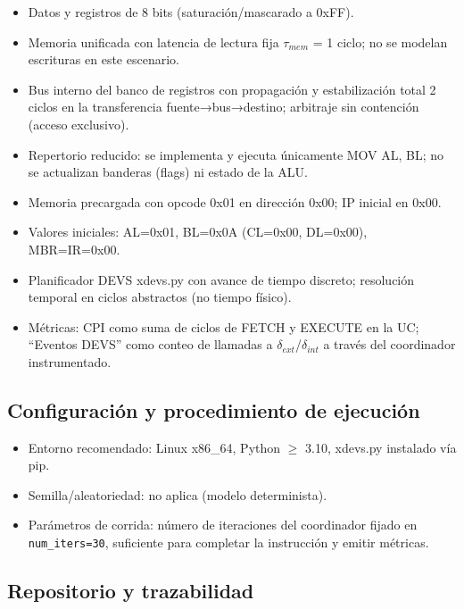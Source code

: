\documentclass[12pt,oneside]{templates/unerthesis}
\providecommand{\tightlist}{%
  \setlength{\itemsep}{0pt}\setlength{\parskip}{0pt}}
\begin{document}
\begin{itemize}
\tightlist
\item
  Datos y registros de 8 bits (saturación/mascarado a 0xFF).
\item
  Memoria unificada con latencia de lectura fija \(\tau_{mem}\) = 1 ciclo; no se modelan escrituras en este escenario.
\item
  Bus interno del banco de registros con propagación y estabilización total 2 ciclos en la transferencia fuente→bus→destino; arbitraje sin contención (acceso exclusivo).
\item
  Repertorio reducido: se implementa y ejecuta únicamente MOV AL, BL; no se actualizan banderas (flags) ni estado de la ALU.
\item
  Memoria precargada con opcode 0x01 en dirección 0x00; IP inicial en 0x00.
\item
  Valores iniciales: AL=0x01, BL=0x0A (CL=0x00, DL=0x00), MBR=IR=0x00.
\item
  Planificador DEVS xdevs.py con avance de tiempo discreto; resolución temporal en ciclos abstractos (no tiempo físico).
\item
  Métricas: CPI como suma de ciclos de FETCH y EXECUTE en la UC; ``Eventos DEVS'' como conteo de llamadas a \(\delta_{ext}\)/\(\delta_{int}\) a través del coordinador instrumentado.
\end{itemize}

\hypertarget{configuraciuxf3n-y-procedimiento-de-ejecuciuxf3n}{%
\subsection{Configuración y procedimiento de ejecución}\label{configuraciuxf3n-y-procedimiento-de-ejecuciuxf3n}}

\begin{itemize}
\tightlist
\item
  Entorno recomendado: Linux x86\_64, Python \(\geq\) 3.10, xdevs.py instalado vía pip.
\item
  Semilla/aleatoriedad: no aplica (modelo determinista).
\item
  Parámetros de corrida: número de iteraciones del coordinador fijado en \texttt{num\_iters=30}, suficiente para completar la instrucción y emitir métricas.
\end{itemize}

\hypertarget{repositorio-y-trazabilidad}{%
\subsection{Repositorio y trazabilidad}\label{repositorio-y-trazabilidad}}
\end{document}
